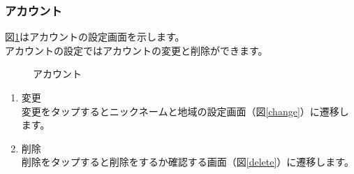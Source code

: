 \documentclass[a4j]{jarticle}
\begin{document}
\newpage
\subsubsection{アカウント}
図\ref{account}はアカウントの設定画面を示します。\\
アカウントの設定ではアカウントの変更と削除ができます。

\begin{figure}[H]
    \begin{center}
    \caption {アカウント}
    \label{account}
    \end{center}
\end{figure}

\begin{enumerate}
  \renewcommand{\labelenumi}{\textcircled{\scriptsize \theenumi}}
\item 変更\\
  変更をタップするとニックネームと地域の設定画面（図\ref{change}）に遷移します。
\item 削除\\
  削除をタップすると削除をするか確認する画面（図\ref{delete}）に遷移します。
\end{enumerate}
\end{document}

